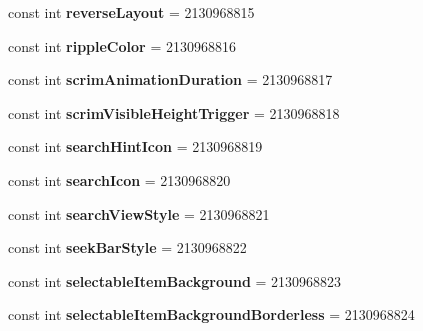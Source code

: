 \begin{DoxyCompactItemize}
const int {\bfseries reverse\+Layout} = 2130968815
\item 
\mbox{\label{classst_delivery_1_1_resource_1_1_attribute_a83cd68f36eedaeea8bdc5a13af417dd0}} 
const int {\bfseries ripple\+Color} = 2130968816
\item 
\mbox{\label{classst_delivery_1_1_resource_1_1_attribute_a827c2e99a097253c151905336828c436}} 
const int {\bfseries scrim\+Animation\+Duration} = 2130968817
\item 
\mbox{\label{classst_delivery_1_1_resource_1_1_attribute_aaa45d0d102a8b8f3528540bc4c5bf03c}} 
const int {\bfseries scrim\+Visible\+Height\+Trigger} = 2130968818
\item 
\mbox{\label{classst_delivery_1_1_resource_1_1_attribute_a33afcbf94dee548cb2fa526283ad0e79}} 
const int {\bfseries search\+Hint\+Icon} = 2130968819
\item 
\mbox{\label{classst_delivery_1_1_resource_1_1_attribute_a333fb4fd697b283acd2244093f62d2fa}} 
const int {\bfseries search\+Icon} = 2130968820
\item 
\mbox{\label{classst_delivery_1_1_resource_1_1_attribute_a7faecaf5a09c755c7f09e2025edd852c}} 
const int {\bfseries search\+View\+Style} = 2130968821
\item 
\mbox{\label{classst_delivery_1_1_resource_1_1_attribute_a47615dd662aa5af5075a33092ea60035}} 
const int {\bfseries seek\+Bar\+Style} = 2130968822
\item 
\mbox{\label{classst_delivery_1_1_resource_1_1_attribute_ad584fd3f6d7b49ca27ea1cf3aad4c396}} 
const int {\bfseries selectable\+Item\+Background} = 2130968823
\item 
\mbox{\label{classst_delivery_1_1_resource_1_1_attribute_ab93a42efd588da9b80df2ef7130128f4}} 
const int {\bfseries selectable\+Item\+Background\+Borderless} = 2130968824

\end{DoxyCompactItemize}
